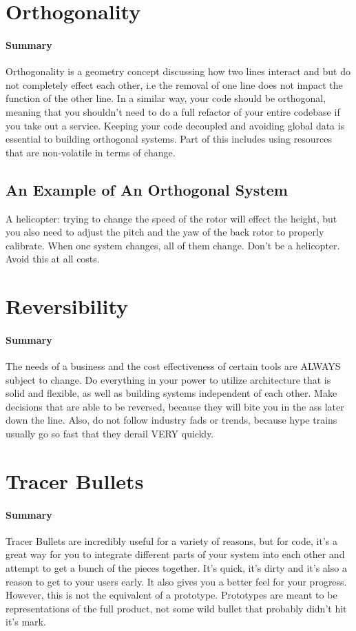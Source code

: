 \documentclass{article}
\begin{document}
\section{Orthogonality}
    \paragraph{Summary}
    Orthogonality is a geometry concept discussing how two lines interact and but do not completely effect each other, i.e the removal of one line does not impact the function of the other line. In a similar way, your code should be orthogonal, meaning that you shouldn't need to do a full refactor of your entire codebase if you take out a service. Keeping your code decoupled and avoiding global data is essential to building orthogonal systems. Part of this includes using resources that are non-volatile in terms of change.
    \subsection*{An Example of An Orthogonal System}
    A helicopter: trying to change the speed of the rotor will effect the height, but you also need to adjust the pitch and the yaw of the back rotor to properly calibrate. When one system changes, all of them change. Don't be a helicopter. Avoid this at all costs.
    
\section{Reversibility}
    \paragraph{Summary}
    The needs of a business and the cost effectiveness of certain tools are ALWAYS subject to change. Do everything in your power to utilize architecture that is solid and flexible, as well as building systems independent of each other. Make decisions that are able to be reversed, because they will bite you in the ass later down the line. Also, do not follow industry fads or trends, because hype trains usually go so fast that they derail VERY quickly.

\section{Tracer Bullets}
    \paragraph{Summary}
    Tracer Bullets are incredibly useful for a variety of reasons, but for code, it's a great way for you to integrate different parts of your system into each other and attempt to get a bunch of the pieces together. It's quick, it's dirty and it's also a reason to get to your users early. It also gives you a better feel for your progress. However, this is not the equivalent of a prototype. Prototypes are meant to be representations of the full product, not some wild bullet that probably didn't hit it's mark.
\end{document}
